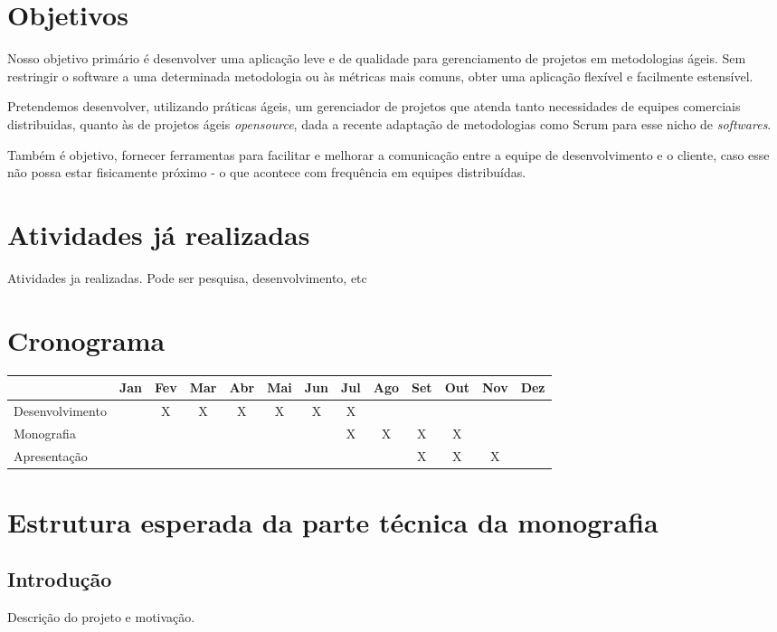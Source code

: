 \documentclass[titlepage]{article}
\begin{document}
\section{Objetivos}
Nosso objetivo primário é desenvolver uma aplicação leve e de qualidade para gerenciamento de projetos em metodologias ágeis. Sem restringir o software a uma determinada metodologia ou às métricas mais comuns, obter uma aplicação flexível e facilmente estensível.

Pretendemos desenvolver, utilizando práticas ágeis, um gerenciador de projetos que atenda tanto necessidades de equipes comerciais distribuidas, quanto às de projetos ágeis \textit{opensource}, dada a recente adaptação de metodologias como Scrum para esse nicho de \textit{softwares}.

Também é objetivo, fornecer ferramentas para facilitar e melhorar a comunicação entre a equipe de desenvolvimento e o cliente, caso esse não possa estar fisicamente próximo - o que acontece com frequência em equipes distribuídas.

\section{Atividades já realizadas}
Atividades ja realizadas. Pode ser pesquisa, desenvolvimento, etc

\section{Cronograma}
\begin{tabular}{|l|c|c|c|c|c|c|c|c|c|c|c|c|}
  \hline
  & Jan & Fev & Mar & Abr & Mai & Jun & Jul & Ago & Set & Out & Nov & Dez \\ \hline
  Desenvolvimento	&  & X& X& X& X& X& X&  &  &  &  &  & \\ \hline
  Monografia 		&  &  &  &  &  &  & X& X& X& X&  &  & \\ \hline
  Apresentação		&  &  &  &  &  &  &  &  & X& X& X&  & \\ \hline
\end{tabular}

\section{Estrutura esperada da parte técnica da monografia}

\subsection{Introdução}
Descrição do projeto e motivação.
\end{document}
